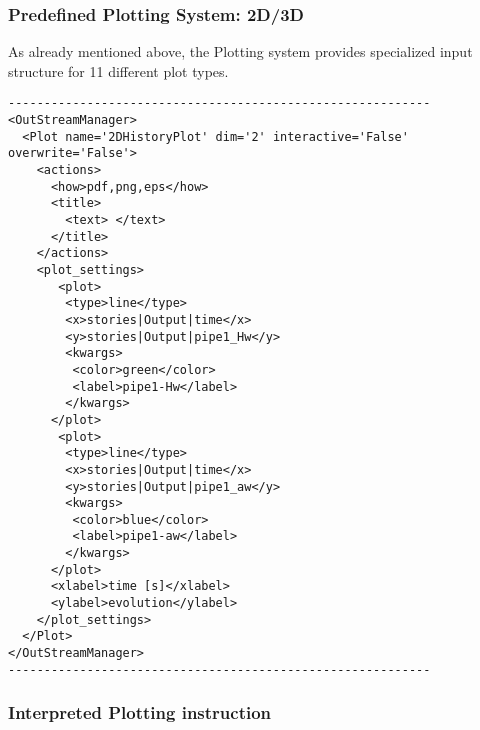\subsubsection{Predefined Plotting System: 2D/3D \label{sec:2Dplotting}}
As already mentioned above, the Plotting system provides specialized input structure for 11 different plot types. 
\begin{lstlisting}[style=XML]
-----------------------------------------------------------
<OutStreamManager>
  <Plot name='2DHistoryPlot' dim='2' interactive='False' overwrite='False'>
    <actions>
      <how>pdf,png,eps</how>
      <title>
        <text> </text>
      </title>
    </actions>
    <plot_settings>
       <plot>
        <type>line</type>
        <x>stories|Output|time</x>
        <y>stories|Output|pipe1_Hw</y> 
        <kwargs>
         <color>green</color>
         <label>pipe1-Hw</label>
        </kwargs>
      </plot>
       <plot>
        <type>line</type>
        <x>stories|Output|time</x>
        <y>stories|Output|pipe1_aw</y> 
        <kwargs>
         <color>blue</color>
         <label>pipe1-aw</label>
        </kwargs>
      </plot>
      <xlabel>time [s]</xlabel>
      <ylabel>evolution</ylabel>
    </plot_settings>
  </Plot>
</OutStreamManager>
-----------------------------------------------------------
\end{lstlisting}

\subsubsection{Interpreted Plotting instruction \label{sec:Interpretedplotting}}











